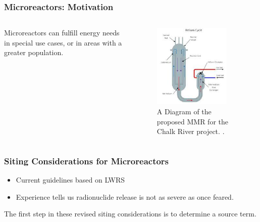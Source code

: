 \begin{frame}
\frametitle{Microreactors: Motivation}
\begin{columns}
  \column[t]{5cm}
  Microreactors can fulfill energy needs in special use cases, or in
  areas with a greater population.
  \column[t]{5cm}
    \begin{figure}[htbp!]
    \begin{center}
    \includegraphics[height=4cm]{./images/mmr-chalk-river}
    \end{center}
    \caption{A Diagram of the proposed MMR for the Chalk River project. \cite{mmr-chalk-river}.}
    \label{fig:mmr-chalk-river}
    \end{figure}

\end{columns}
\end{frame}


\begin{frame}
\frametitle{Siting Considerations for Microreactors}

  \begin{itemize}
    \item Current guidelines based on LWRS
    \item Experience tells us radionuclide release is not as severe as once feared.
  \end{itemize}

  The first step in these revised siting considerations is to determine a source term.

\end{frame}

